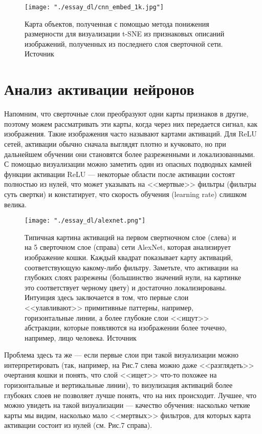 \documentclass[12pt,fleqn]{article}
\begin{document}
\begin{figure}[H]
\centering
\texttt{[image: "./essay\_dl/cnn\_embed\_1k.jpg"]}
\caption{Карта объектов, полученная с помощью метода понижения размерности для визуализации t-SNE из признаковых описаний изображений, полученных из последнего слоя сверточной сети. Источник \cite{t-SNE}}
\end{figure}

\section{Анализ активации нейронов}

Напомним, что сверточные слои преобразуют одни карты признаков в другие, поэтому можем рассматривать эти карты, когда через них передается сигнал, как изображения. Такие изображения часто называют картами активаций. Для ReLU сетей, активации обычно сначала выглядят плотно и кучковато, но при дальнейшем обучении они становятся более разреженными и локализованными. С помощью визуализации можно заметить один из опасных подводных камней функции активации ReLU --- некоторые области после активации состоят полностью из нулей, что может указывать на <<мертвые>> фильтры (фильтры суть свертки) и констатирует, что скорость обучения (learning rate) слишком велика.

\begin{figure}[H]
\centering
\texttt{[image: "./essay\_dl/alexnet.png"]}
\caption{Типичная картина активаций на первом свертночном слое (слева) и на 5 сверточном слое (справа) сети AlexNet, которая анализирует изображение кошки. Каждый квадрат показывает карту активаций, соответствующую какому-либо фильтру. Заметьте, что активации на глубоких слоях разрежены (большинство значений нули, на картинке это соответствует черному цвету) и достаточно локализированы. Интуиция здесь заключается в том, что первые слои <<улавливают>> примитивные паттерны, например, горизонтальные линии, а более глубокие слои <<ищут>> абстракции, которые появляются на изображении более точечно, например, лицо человека. Источник \cite{CS231N}}
\end{figure}

Проблема здесь та же --- если первые слои при такой визуализации можно интерпретировать  (так, например, на Рис.7 слева можно даже <<разглядеть>> очертания кошки и понять, что слой <<ищет>> что-то похожее на горизонтальные и вертикальные линии), то визулизация активаций более глубоких слоев не позволяет лучше понять, что на них происходит. Лучшее, что можно увидеть на такой визуализации --- качество обучения: насколько четкие карты мы видим, насколько мало <<мертвых>> фильтров, для которых карта активации состоит из нулей (см. Рис.7 справа). 
\end{document}
